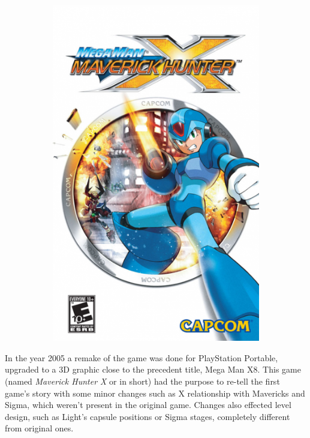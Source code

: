 \begin{figure}[htp]
\begin{subfigure}{0.4\linewidth}
		\includegraphics[width=\linewidth]{figures/X1/mmxmh.png}
	\end{subfigure}
\end{figure}

In the year 2005 a remake of the game was done for PlayStation Portable, upgraded to a 3D graphic close to the precedent title, Mega Man X8. This game (named \textit{Maverick Hunter X }or \mhx in short) had the purpose to re-tell the first game's story with some minor changes such as X relationship with Mavericks and Sigma, which weren't present in the original game. Changes also effected level design, such as Light's capsule positions or Sigma stages, completely different from original ones.



